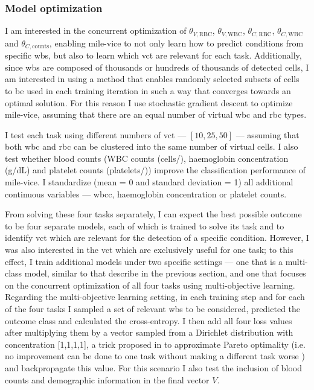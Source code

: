 \subsubsection{Model optimization}

I am interested in the concurrent optimization of $\theta_{V,\mathrm{RBC}}$, $\theta_{V,\mathrm{WBC}}$, $\theta_{C,\mathrm{RBC}}$, $\theta_{C,\mathrm{WBC}}$ and $\theta_{C,\mathrm{counts}}$, enabling \ac{mile-vice} to not only learn how to predict conditions from specific \ac{wbs}, but also to learn which \ac{vct} are relevant for each task. Additionally, since \ac{wbs} are composed of thousands or hundreds of thousands of detected cells, I am interested in using a method that enables randomly selected subsets of cells to be used in each training iteration in such a way that converges towards an optimal solution. For this reason I use stochastic gradient descent to optimize \ac{mile-vice}, assuming that there are an equal number of virtual \ac{wbc} and \ac{rbc} types.

I test each task using different numbers of \ac{vct} --- $[10, 25, 50]$ --- assuming that both \ac{wbc} and \ac{rbc} can be clustered into the same number of virtual cells. I also test whether blood counts (WBC counts (cells/\Mum), haemoglobin concentration (g/dL) and platelet counts (platelets/\Mum)) improve the classification performance of \ac{mile-vice}. I standardize (mean = 0 and standard deviation = 1) all additional continuous variables --- \ac{wbcc}, haemoglobin concentration or platelet counts. 

From solving these four tasks separately, I can expect the best possible outcome to be four separate models, each of which is trained to solve its task and to identify \ac{vct} which are relevant for the detection of a specific condition. However, I was also interested in the \ac{vct} which are exclusively useful for one task; to this effect, I train additional models under two specific settings --- one that is a multi-class model, similar to that describe in the previous section, and one that focuses on the concurrent optimization of all four tasks using multi-objective learning. Regarding the multi-objective learning setting, in each training step and for each of the four tasks I sampled a set of relevant \ac{wbs} to be considered, predicted the outcome class and calculated the cross-entropy. I then add all four loss values after multiplying them by a vector sampled from a Dirichlet distribution with concentration [1,1,1,1], a trick proposed in \cite{Ruchte2021-ch} to approximate Pareto optimality (i.e. no improvement can be done to one task without making a different task worse \cite{Censor1977-nd}) and backpropagate this value. For this scenario I also test the inclusion of blood counts and demographic information in the final vector $V$.

